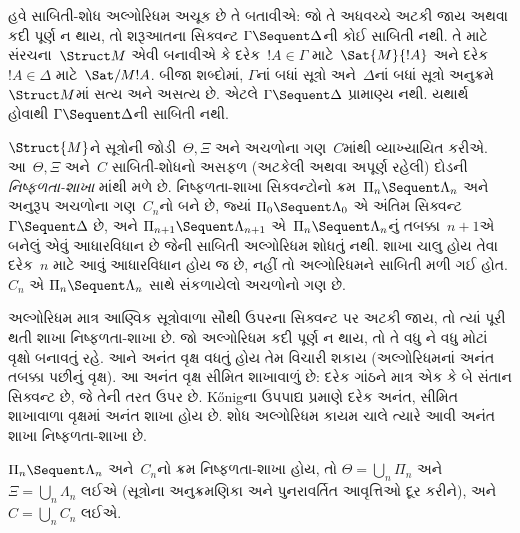 \begingroup
\makeatletter{}\makeatother


\label{guunit:OLP-0679}


હવે સાબિતી-શોધ
અલ્ગોરિધમ અચૂક
છે તે બતાવીએ:
જો તે અધવચ્ચે
અટકી જાય અથવા
કદી પૂર્ણ ન
થાય, તો શરૂઆતના
સિક્વન્ટ
$\Gamma \Sequent \Delta$ની
કોઈ સાબિતી
નથી. તે માટે
સંરચના~$\Struct M$
એવી બનાવીએ કે
દરેક~$!A \in \Gamma$
માટે~$\Sat{M}{!A}$
અને દરેક
$!A \in \Delta$
માટે~$\Sat/{M}{!A}$.
બીજા શબ્દોમાં,
$\Gamma$નાં બધાં
સૂત્રો
અને~$\Delta$નાં
બધાં સૂત્રો
અનુક્રમે
$\Struct M$માં
સત્ય અને અસત્ય
છે. એટલે
$\Gamma \Sequent \Delta$
પ્રામાણ્ય નથી.
 યથાર્થ
હોવાથી
$\Gamma \Sequent \Delta$ની
સાબિતી નથી.

$\Struct{M}$ને
સૂત્રોની
જોડી~$\Theta, \Xi$
અને
અચળોના
ગણ~$C$માંથી
વ્યાખ્યાયિત કરીએ.
આ~$\Theta, \Xi$
અને~$C$
સાબિતી-શોધનો
અસફળ (અટકેલી
અથવા અપૂર્ણ
રહેલી) દોડની
\emph{નિષ્ફળતા-શાખા}
માંથી મળે છે.
નિષ્ફળતા-શાખા
સિક્વન્ટોનો
ક્રમ~$\Pi_n \Sequent
\Lambda_n$
અને અનુરૂપ
અચળોના
ગણ~$C_n$નો
બને છે, જ્યાં
$\Pi_0 \Sequent \Lambda_0$
એ અંતિમ
સિક્વન્ટ
$\Gamma \Sequent
\Delta$ છે,
અને
$\Pi_{n+1} \Sequent \Lambda_{n+1}$
એ~$\Pi_n
\Sequent \Lambda_n$નું
તબક્કા~$n+1$એ
બનેલું એવું
આધારવિધાન છે
જેની સાબિતી
અલ્ગોરિધમ શોધતું
નથી. શાખા
ચાલુ હોય તેવા
દરેક~$n$
માટે આવું
આધારવિધાન હોય
જ છે, નહીં તો
અલ્ગોરિધમને
સાબિતી
મળી ગઈ હોત.
$C_n$ એ
$\Pi_n
\Sequent \Lambda_n$
સાથે સંકળાયેલો
અચળોનો
ગણ છે.

અલ્ગોરિધમ માત્ર
આણ્વિક
સૂત્રોવાળા
સૌથી ઉપરના
સિક્વન્ટ પર
અટકી જાય,
તો ત્યાં પૂરી
થતી શાખા
નિષ્ફળતા-શાખા
છે. જો
અલ્ગોરિધમ
કદી પૂર્ણ ન
થાય, તો તે
વધુ ને વધુ
મોટાં વૃક્ષો
બનાવતું રહે.
આને અનંત
વૃક્ષ વધતું
હોય તેમ
વિચારી શકાય
(અલ્ગોરિધમનાં
અનંત તબક્કા
પછીનું વૃક્ષ).
આ અનંત વૃક્ષ
સીમિત શાખાવાળું
છે: દરેક ગાંઠને
માત્ર એક કે
બે સંતાન
સિક્વન્ટ છે,
જે તેની તરત
ઉપર છે.
K\H{o}nigના
ઉપપાદ્ય પ્રમાણે
દરેક અનંત,
સીમિત શાખાવાળા
વૃક્ષમાં અનંત
શાખા હોય છે.
શોધ અલ્ગોરિધમ
કાયમ ચાલે
ત્યારે આવી
અનંત શાખા
નિષ્ફળતા-શાખા
છે.

$\Pi_n \Sequent \Lambda_n$
અને~$C_n$નો
ક્રમ નિષ્ફળતા-શાખા
હોય, તો
$\Theta = \bigcup_n \Pi_n$
અને
$\Xi = \bigcup_n \Lambda_n$
લઈએ
(સૂત્રોના
અનુક્રમણિકા અને
પુનરાવર્તિત
આવૃત્તિઓ દૂર
કરીને), અને
$C =
\bigcup_n C_n$
લઈએ.

